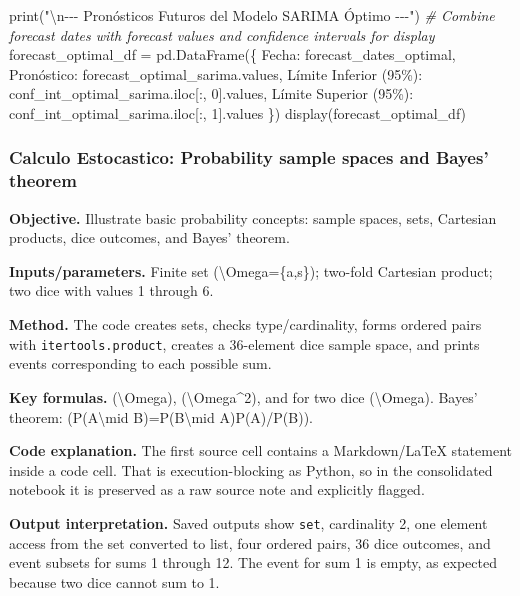 \documentclass[
  11pt,
]{article}
\newenvironment{Shaded}{}{}
\newcommand{\BuiltInTok}[1]{\textcolor[rgb]{0.00,0.50,0.00}{#1}}
\newcommand{\CharTok}[1]{\textcolor[rgb]{0.25,0.44,0.63}{#1}}
\newcommand{\CommentTok}[1]{\textcolor[rgb]{0.38,0.63,0.69}{\textit{#1}}}
\newcommand{\DecValTok}[1]{\textcolor[rgb]{0.25,0.63,0.44}{#1}}
\newcommand{\NormalTok}[1]{#1}
\newcommand{\OperatorTok}[1]{\textcolor[rgb]{0.40,0.40,0.40}{#1}}
\newcommand{\StringTok}[1]{\textcolor[rgb]{0.25,0.44,0.63}{#1}}
\begin{document}
\begin{Shaded}
\begin{Highlighting}[]
\BuiltInTok{print}\NormalTok{(}\StringTok{"}\CharTok{\textbackslash{}n}\StringTok{{-}{-}{-} Pronósticos Futuros del Modelo SARIMA Óptimo {-}{-}{-}"}\NormalTok{)}
\CommentTok{\# Combine forecast dates with forecast values and confidence intervals for display}
\NormalTok{forecast\_optimal\_df }\OperatorTok{=}\NormalTok{ pd.DataFrame(\{}
    \StringTok{\textquotesingle{}Fecha\textquotesingle{}}\NormalTok{: forecast\_dates\_optimal,}
    \StringTok{\textquotesingle{}Pronóstico\textquotesingle{}}\NormalTok{: forecast\_optimal\_sarima.values,}
    \StringTok{\textquotesingle{}Límite Inferior (95\%)\textquotesingle{}}\NormalTok{: conf\_int\_optimal\_sarima.iloc[:, }\DecValTok{0}\NormalTok{].values,}
    \StringTok{\textquotesingle{}Límite Superior (95\%)\textquotesingle{}}\NormalTok{: conf\_int\_optimal\_sarima.iloc[:, }\DecValTok{1}\NormalTok{].values}
\NormalTok{\})}
\NormalTok{display(forecast\_optimal\_df)}
\end{Highlighting}
\end{Shaded}

\subsubsection{Calculo Estocastico: Probability sample spaces and Bayes' theorem}\label{calculo-estocastico-probability-sample-spaces-and-bayes-theorem}

\textbf{Objective.} Illustrate basic probability concepts: sample spaces, sets, Cartesian products, dice outcomes, and Bayes' theorem.

\textbf{Inputs/parameters.} Finite set (\textbackslash Omega=\{a,s\}); two-fold Cartesian product; two dice with values 1 through 6.

\textbf{Method.} The code creates sets, checks type/cardinality, forms ordered pairs with \texttt{itertools.product}, creates a 36-element dice sample space, and prints events corresponding to each possible sum.

\textbf{Key formulas.} (\textbar\textbackslash Omega), (\textbar\textbackslash Omega\^{}2), and for two dice (\textbar\textbackslash Omega). Bayes' theorem: (P(A\textbackslash mid B)=P(B\textbackslash mid A)P(A)/P(B)).

\textbf{Code explanation.} The first source cell contains a Markdown/LaTeX statement inside a code cell. That is execution-blocking as Python, so in the consolidated notebook it is preserved as a raw source note and explicitly flagged.

\textbf{Output interpretation.} Saved outputs show \texttt{set}, cardinality 2, one element access from the set converted to list, four ordered pairs, 36 dice outcomes, and event subsets for sums 1 through 12. The event for sum 1 is empty, as expected because two dice cannot sum to 1.
\end{document}
